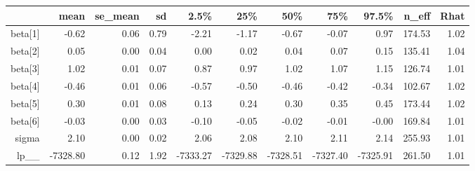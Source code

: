 \begin{table}[ht]
\centering
\begin{tabular}{rrrrrrrrrrr}
  \hline
 & mean & se\_mean & sd & 2.5\% & 25\% & 50\% & 75\% & 97.5\% & n\_eff & Rhat \\ 
  \hline
beta[1] & -0.62 & 0.06 & 0.79 & -2.21 & -1.17 & -0.67 & -0.07 & 0.97 & 174.53 & 1.02 \\ 
  beta[2] & 0.05 & 0.00 & 0.04 & 0.00 & 0.02 & 0.04 & 0.07 & 0.15 & 135.41 & 1.04 \\ 
  beta[3] & 1.02 & 0.01 & 0.07 & 0.87 & 0.97 & 1.02 & 1.07 & 1.15 & 126.74 & 1.01 \\ 
  beta[4] & -0.46 & 0.01 & 0.06 & -0.57 & -0.50 & -0.46 & -0.42 & -0.34 & 102.67 & 1.02 \\ 
  beta[5] & 0.30 & 0.01 & 0.08 & 0.13 & 0.24 & 0.30 & 0.35 & 0.45 & 173.44 & 1.02 \\ 
  beta[6] & -0.03 & 0.00 & 0.03 & -0.10 & -0.05 & -0.02 & -0.01 & -0.00 & 169.84 & 1.01 \\ 
  sigma & 2.10 & 0.00 & 0.02 & 2.06 & 2.08 & 2.10 & 2.11 & 2.14 & 255.93 & 1.01 \\ 
  lp\_\_ & -7328.80 & 0.12 & 1.92 & -7333.27 & -7329.88 & -7328.51 & -7327.40 & -7325.91 & 261.50 & 1.01 \\ 
   \hline
\end{tabular}
\end{table}
